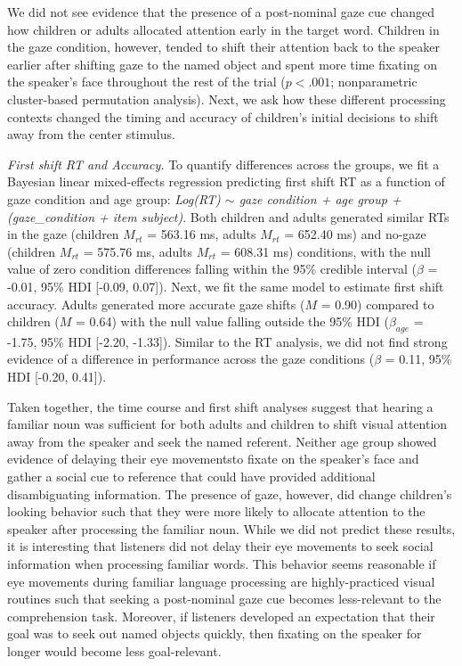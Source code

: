 \documentclass[man,floatsintext]{apa6}
\begin{document}
We did not see evidence that the presence of a post-nominal gaze cue
changed how children or adults allocated attention early in the target
word. Children in the gaze condition, however, tended to shift their
attention back to the speaker earlier after shifting gaze to the named
object and spent more time fixating on the speaker's face throughout the
rest of the trial (\(p < .001\); nonparametric cluster-based permutation
analysis). Next, we ask how these different processing contexts changed
the timing and accuracy of children's initial decisions to shift away
from the center stimulus.

\emph{First shift RT and Accuracy.} To quantify differences across the
groups, we fit a Bayesian linear mixed-effects regression predicting
first shift RT as a function of gaze condition and age group:
\emph{Log(RT) \(\sim\) gaze condition + age group + (gaze\_condition +
item \textbar{} subject)}. Both children and adults generated similar
RTs in the gaze (children \(M_{rt}\) = 563.16 ms, adults \(M_{rt}\) =
652.40 ms) and no-gaze (children \(M_{rt}\) = 575.76 ms, adults
\(M_{rt}\) = 608.31 ms) conditions, with the null value of zero
condition differences falling within the 95\% credible interval
(\(\beta\) = -0.01, 95\% HDI {[}-0.09, 0.07{]}). Next, we fit the same
model to estimate first shift accuracy. Adults generated more accurate
gaze shifts (\(M\) = 0.90) compared to children (\(M\) = 0.64) with the
null value falling outside the 95\% HDI (\(\beta_{age}\) = -1.75, 95\%
HDI {[}-2.20, -1.33{]}). Similar to the RT analysis, we did not find
strong evidence of a difference in performance across the gaze
conditions (\(\beta\) = 0.11, 95\% HDI {[}-0.20, 0.41{]}).

Taken together, the time course and first shift analyses suggest that
hearing a familiar noun was sufficient for both adults and children to
shift visual attention away from the speaker and seek the named
referent. Neither age group showed evidence of delaying their eye
movementsto fixate on the speaker's face and gather a social cue to
reference that could have provided additional disambiguating
information. The presence of gaze, however, did change children's
looking behavior such that they were more likely to allocate attention
to the speaker after processing the familiar noun. While we did not
predict these results, it is interesting that listeners did not delay
their eye movements to seek social information when processing familiar
words. This behavior seems reasonable if eye movements during familiar
language processing are highly-practiced visual routines such that
seeking a post-nominal gaze cue becomes less-relevant to the
comprehension task. Moreover, if listeners developed an expectation that
their goal was to seek out named objects quickly, then fixating on the
speaker for longer would become less goal-relevant.
\end{document}
